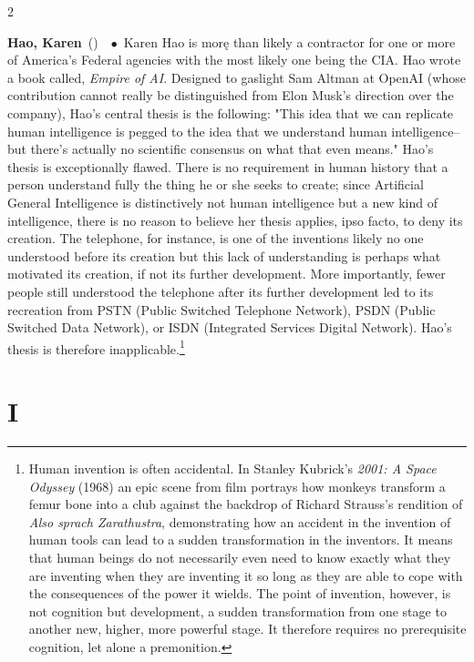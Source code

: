 \documentclass[10pt,a4paper,twoside]{article} %
\newcommand{\entry}[4]{\markboth{#1}{#1}\textbf{#1}\ {(#2)}\ \textit{#3}\ $\bullet$\ {#4}}  %
\begin{document}
\begin{multicols}{2}
\entry{Hao, Karen} {} {} {Karen Hao is morę than likely a contractor for one or more of America's Federal agencies with the most likely one being the CIA. Hao wrote a book called, \emph{Empire of AI}. Designed to gaslight Sam Altman at OpenAI (whose contribution cannot really be distinguished from Elon Musk's direction over the company), Hao's central thesis is the following: "This idea that we can replicate human intelligence is pegged to the idea that we understand human intelligence--but there's actually no scientific consensus on what that even means." Hao's thesis is exceptionally flawed. There is no requirement in human history that a person understand fully the thing he or she seeks to create; since Artificial General Intelligence is distinctively not human intelligence but a new kind of intelligence, there is no reason to believe her thesis applies, ipso facto, to deny its creation. The telephone, for instance, is one of the inventions likely no one understood before its creation but this lack of understanding is perhaps what motivated its creation, if not its further development. More importantly, fewer people still understood the telephone after its further development led to its recreation from PSTN (Public Switched Telephone Network), PSDN (Public Switched Data Network), or ISDN (Integrated Services Digital Network). Hao's thesis is therefore inapplicable.\footnote{Human invention is often accidental. In Stanley Kubrick's \emph{2001: A Space Odyssey} (1968) an epic scene from film portrays how monkeys transform a femur bone into a club against the backdrop of Richard Strauss's rendition of \emph{Also sprach Zarathustra}, demonstrating how an accident in the invention of human tools can lead to a sudden transformation in the inventors. It means that human beings do not necessarily even need to know exactly what they are inventing when they are inventing it so long as they are able to cope with the consequences of the power it wields. The point of invention, however, is not cognition but development, a sudden transformation from one stage to another new, higher, more powerful stage. It therefore requires no prerequisite cognition, let alone a premonition.}  
} 


\end{multicols}


\section*{I}
\end{document}
